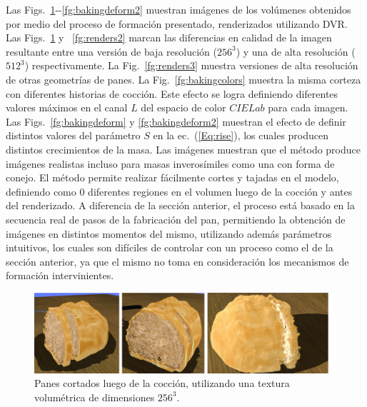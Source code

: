 Las Figs.~\ref{fg:renders}{-{}-}\ref{fg:bakingdeform2} muestran imágenes de los volúmenes obtenidos por medio del proceso de formación presentado, renderizados utilizando DVR.
Las Figs.~\ref{fg:renders} y ~\ref{fg:renders2} marcan las diferencias en calidad de la imagen resultante entre una versión de baja resolución ($256^{3}$) y una de alta resolución ($512^{3}$) respectivamente.
La Fig.~\ref{fg:renders3} muestra versiones de alta resolución de otras geometrías de panes.
La Fig.~\ref{fg:bakingcolors} muestra la misma corteza con diferentes historias de cocción.
Este efecto se logra definiendo diferentes valores máximos en el canal $L$ del espacio de color $CIELab$ para cada imagen.
Las Figs.~\ref{fg:bakingdeform} y \ref{fg:bakingdeform2} muestran el efecto de definir distintos valores del parámetro $S$ en la ec.~(\ref{Eq:rise}), los cuales producen distintos crecimientos de la masa.
Las imágenes muestran que el método produce imágenes realistas incluso para masas inverosímiles como una con forma de conejo.
El método permite realizar fácilmente cortes y tajadas en el modelo, definiendo como $0$ diferentes regiones en el volumen luego de la cocción y antes del renderizado.
A diferencia de la sección anterior, el proceso está basado en la secuencia real de pasos de la fabricación del pan, permitiendo la obtención de imágenes en distintos momentos del mismo, utilizando además parámetros intuitivos, los cuales son difíciles de controlar con un proceso como el de la sección anterior, ya que el mismo no toma en consideración los mecanismos de formación intervinientes.


\begin{figure}[!ht]
\begin{center}
\includegraphics[width=13cm]{figures/Fig10}
\caption{Panes cortados luego de la cocción, utilizando una textura volumétrica de dimensiones $256^{3}$.}
\label{fg:renders}
\end{center}
\end{figure}

